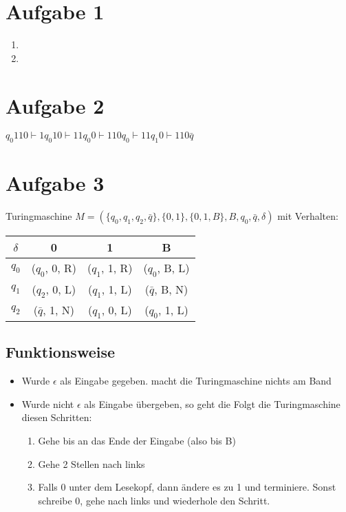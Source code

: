 \documentclass[a4paper,11pt]{scrartcl}
\begin{document}
	\section*{Aufgabe 1}
	\begin{enumerate}[label=\alph*)]
		\item 
		\item 
	\end{enumerate}
	
	
	\section*{Aufgabe 2}
	$q_0 110 \vdash 1 q_0 10 \vdash 11 q_0 0 \vdash 110 q_0 \vdash 11 q_1 0 \vdash 110 \bar{q}$
	
	
	\section*{Aufgabe 3}
	Turingmaschine $M= (\{q_0 , q_1 , q_2 , \bar{q}\}, \{0,1\}, \{0,1,B\}, B, q_0, \bar{q}, \delta)$ mit Verhalten:\\
	\begin{tabular}{c | c c c}
	$\delta$ & 0 & 1 & B \\
	\hline
	$q_0$ & ($q_0$, 0, R) & ($q_1$, 1, R) & ($q_0$, B, L) \\
	$q_1$ & ($q_2$, 0, L) & ($q_1$, 1, L) & ($\bar{q}$, B, N) \\
	$q_2$ & ($\bar{q}$, 1, N) & ($q_1$, 0, L) & ($q_0$, 1, L) \\
	\end{tabular}
	\subsection*{Funktionsweise}
	\begin{itemize}
	\item Wurde $\epsilon$ als Eingabe gegeben. macht die Turingmaschine nichts am Band
	\item Wurde nicht $\epsilon$ als Eingabe übergeben, so geht die Folgt die Turingmaschine diesen Schritten:
		\begin{enumerate}[label=\arabic*.)]
		\item Gehe bis an das Ende der Eingabe (also bis B)
		\item Gehe 2 Stellen nach links
		\item Falls 0 unter dem Lesekopf, dann ändere es zu 1 und terminiere. Sonst schreibe 0, gehe nach links und wiederhole den Schritt.
		\end{enumerate}
	\end{itemize}
	
\end{document}
